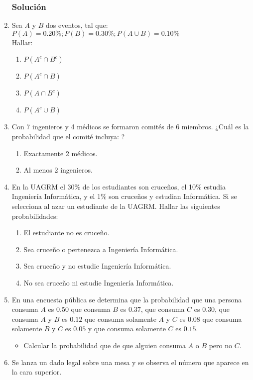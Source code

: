 \begin{enumerate}
\subsubsection{Solución}
\item Sea $A$ y $B$ dos eventos, tal que: $P(A)=0.20\% ; P(B)=0.30\%;P(A\cup B)=0.10\%$ \\ Hallar:
\begin{enumerate}[label=(\alph*)]
\item $P(A^c\cap B^c)$
\item $P(A^c\cap B)$
\item $P(A\cap B^c)$
\item $P(A^c\cup B)$
\end{enumerate}
\item Con 7 ingenieros y 4 médicos se formaron comités de 6 miembros. ¿Cuál es la probabilidad que el comité incluya: ?
\begin{enumerate}[label=(\alph*)]
\item Exactamente 2 médicos.
\item Al menos 2 ingenieros.
\end{enumerate}
\item En la UAGRM el 30\% de los estudiantes son cruceños, el 10\% estudia Ingeniería Informática, y el 1\% son cruceños y estudian Informática. Si se selecciona al azar un estudiante de la UAGRM. Hallar las siguientes probabilidades:
\begin{enumerate}
\item El estudiante no es cruceño.
\item Sea cruceño o pertenezca a Ingeniería Informática.
\item Sea cruceño y no estudie Ingeniería Informática.
\item No sea cruceño ni estudie Ingeniería Informática.
\end{enumerate}
\item En una encuesta pública se determina que la probabilidad que una persona consuma $A$ es $0.50$ que consuma $B$ es $0.37$, que consuma $C$ es $0.30$, que consuma $A$ y $B$ es $0.12$ que consuma solamente $A$ y $C$ es $0.08$ que consuma solamente $B$ y $C$ es $0.05$ y que consuma solamente $C$ es $0.15$.
\begin{itemize}
\item Calcular la probabilidad que de que alguien consuma $A$ o $B$ pero no $C$.
\end{itemize}
\item Se lanza un dado legal sobre una mesa y se observa el número que aparece en la cara superior.

\end{enumerate}

